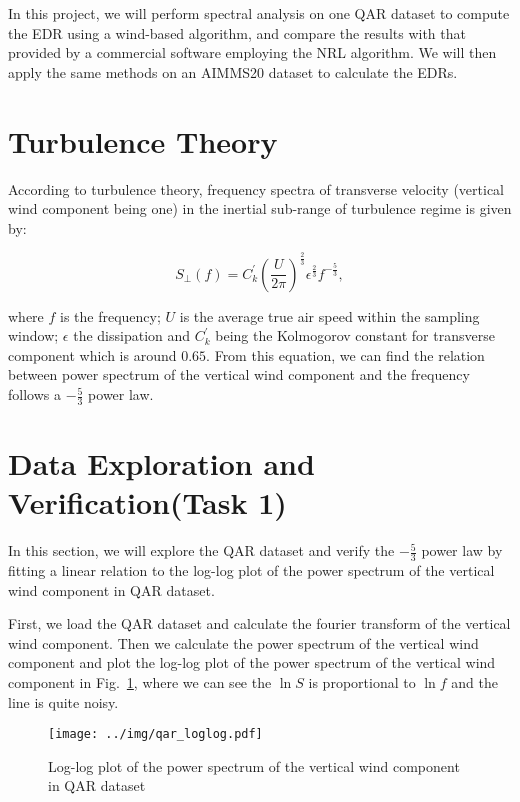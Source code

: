 \documentclass[runningheads]{llncs}
\begin{document}
In this project, we will perform spectral analysis on one QAR dataset to compute the EDR using a wind-based algorithm, and compare the results with that provided by a commercial software employing the NRL algorithm. 
We will then apply the same methods on an AIMMS20 dataset to calculate the EDRs.

\section{Turbulence Theory}

According to turbulence theory, frequency spectra of transverse velocity (vertical wind component being one) in the inertial sub-range of turbulence regime is given by:

\begin{equation}
    S_{\perp}(f)=C_k^{'}\left(\frac{U}{2\pi}\right)^{\frac23}\epsilon^{\frac23}f^{-\frac53},
\end{equation}

where $f$ is the frequency; $U$ is the average true air speed within the sampling window; $\epsilon$ the dissipation and $C^{'}_k$ being the Kolmogorov constant for transverse
component which is around $0.65$. From this equation, we can find the relation between power spectrum of the vertical wind component and the frequency follows a $-\frac53$ power law.

\section{Data Exploration and Verification(Task 1)}

In this section, we will explore the QAR dataset and verify the $-\frac53$ power law by fitting a linear relation to the log-log plot of the power spectrum of the vertical wind component in QAR dataset.

First, we load the QAR dataset and calculate the fourier transform of the vertical wind component. 
Then we calculate the power spectrum of the vertical wind component 
and plot the log-log plot of the power spectrum of the vertical wind component in Fig.~\ref{fig:qar_loglog},
where we can see the $\ln{S}$ is proportional to $\ln{f}$ and the line is quite noisy.

\begin{figure}[htbp]
    \centering
    \texttt{[image: ../img/qar\_loglog.pdf]}
    \caption{Log-log plot of the power spectrum of the vertical wind component in QAR dataset}
    \label{fig:qar_loglog}
\end{figure}
\end{document}
